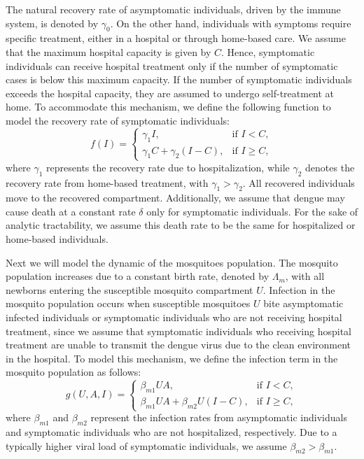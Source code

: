 \documentclass[preprint]{elsarticle}
\begin{document}
The natural recovery rate of asymptomatic individuals, driven by the immune system, is denoted by $\gamma_0$. On the other hand, individuals with symptoms require specific treatment, either in a hospital or through home-based care. We assume that the maximum hospital capacity is given by $C$. Hence, symptomatic individuals can receive hospital treatment only if the number of symptomatic cases is below this maximum capacity. If the number of symptomatic individuals exceeds the hospital capacity, they are assumed to undergo self-treatment at home. To accommodate this mechanism, we define the following function to model the recovery rate of symptomatic individuals:
\begin{equation}\label{recovery}
    f(I) =
    \begin{cases}
      \gamma_1 I, & \text{if } I < C, \\
      \gamma_1 C + \gamma_2 (I - C), & \text{if } I \geq C,
    \end{cases}
\end{equation}
where $\gamma_1$ represents the recovery rate due to hospitalization, while $\gamma_2$ denotes the recovery rate from home-based treatment, with $\gamma_1 > \gamma_2$. All recovered individuals move to the recovered compartment. Additionally, we assume that dengue may cause death at a constant rate $\delta$ only for symptomatic individuals. For the sake of analytic tractability, we assume this death rate to be the same for hospitalized or home-based individuals.


Next we will model the dynamic of the mosquitoes population. The mosquito population increases due to a constant birth rate, denoted by $\Lambda_m$, with all newborns entering the susceptible mosquito compartment $U$. Infection in the mosquito population occurs when susceptible mosquitoes $U$ bite asymptomatic infected individuals or symptomatic individuals who are not receiving hospital treatment, since we assume that symptomatic individuals who receiving hospital treatment are unable to transmit the dengue virus due to the clean environment in the hospital. To model this mechanism, we define the infection term in the mosquito population as follows:
\begin{equation}\label{inf}
    g(U,A,I) =
    \begin{cases}
      \beta_{m1} U A, & \text{if } I < C, \\
      \beta_{m1} U A + \beta_{m2} U (I - C), & \text{if } I \geq C,
    \end{cases}
\end{equation}
where $\beta_{m1}$ and $\beta_{m2}$ represent the infection rates from asymptomatic individuals and symptomatic individuals who are not hospitalized, respectively. Due to a typically higher viral load of symptomatic individuals, we assume $\beta_{m2}>\beta_{m1}$.
\end{document}
